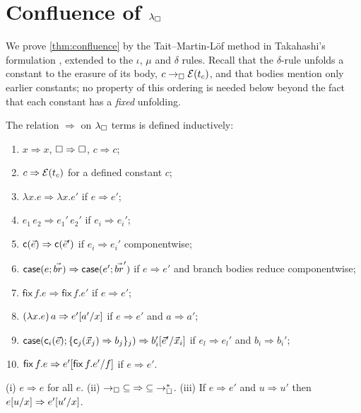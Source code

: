 \section{Confluence of \texorpdfstring{$\lambda_{\square}$}{lambda-box}}
\label{sec:confluence}

We prove \cref{thm:confluence} by the Tait--Martin-L{\"o}f method in
Takahashi's formulation \cite{Takahashi1995}, extended to the $\iota$,
$\mu$ and $\delta$ rules.  Recall that the $\delta$-rule unfolds a
constant to the erasure of its body, $c \rightarrow_{\square} \mathcal{E}(t_c)$, and that
bodies mention only earlier constants; no property of this ordering is
needed below beyond the fact that each constant has a \emph{fixed}
unfolding.

\begin{definition}
\label{def:parred}
The relation $\Rightarrow$ on $\lambda_{\square}$ terms is defined inductively:
\begin{enumerate}[leftmargin=2em,itemsep=0.2ex]
\item $x \Rightarrow x$, \quad $\square \Rightarrow \square$, \quad $c
  \Rightarrow c$;
\item $c \Rightarrow \mathcal{E}(t_c)$ for a defined constant $c$;
\item $\lambda x.e \Rightarrow \lambda x.e'$ if $e \Rightarrow e'$;
\item $e_1\,e_2 \Rightarrow e_1'\,e_2'$ if $e_i \Rightarrow e_i'$;
\item $\mathsf{c}(\vec{e}) \Rightarrow \mathsf{c}(\vec{e}')$ if $e_i
  \Rightarrow e_i'$ componentwise;
\item $\mathsf{case}(e; \vec{br}) \Rightarrow \mathsf{case}(e';
  \vec{br}')$ if $e \Rightarrow e'$ and branch bodies reduce
  componentwise;
\item $\mathsf{fix}\,f.e \Rightarrow \mathsf{fix}\,f.e'$ if $e
  \Rightarrow e'$;
\item $(\lambda x.e)\,a \Rightarrow e'[a'/x]$ if $e \Rightarrow
  e'$ and $a \Rightarrow a'$;
\item $\mathsf{case}(\mathsf{c}_i(\vec{e}); \{\mathsf{c}_j(\vec{x}_j)
  \Rightarrow b_j\}_j) \Rightarrow b_i'[\vec{e}'/\vec{x}_i]$ if
  $e_l \Rightarrow e_l'$ and $b_i \Rightarrow b_i'$;
\item $\mathsf{fix}\,f.e \Rightarrow
  e'[\mathsf{fix}\,f.e'/f]$ if $e \Rightarrow e'$.
\end{enumerate}
\end{definition}

\begin{lemma}
\label{lem:parred-basic}
(i) $e \Rightarrow e$ for all $e$.\quad
(ii) $\rightarrow_{\square}\; \subseteq\; \Rightarrow\; \subseteq\; \rightarrow_{\square}^{*}$.\quad
(iii) If $e \Rightarrow e'$ and $u \Rightarrow u'$ then
$e[u/x] \Rightarrow e'[u'/x]$.
\end{lemma}

